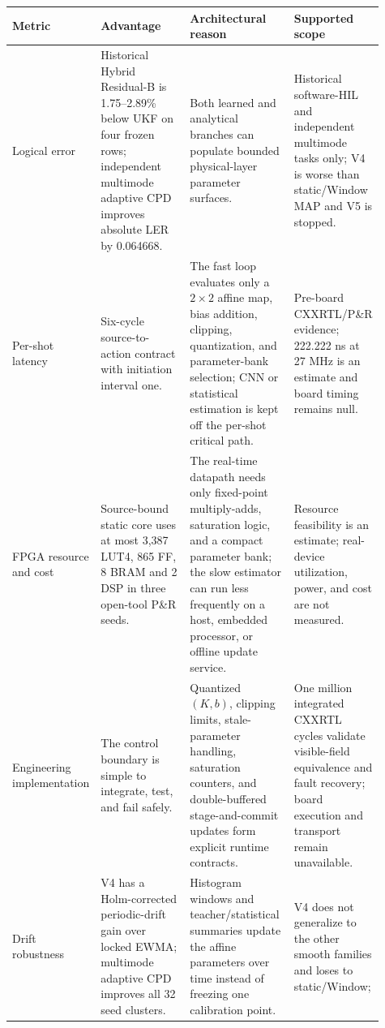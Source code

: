 \documentclass[11pt]{article}
\begin{document}
\begin{table}[ht]
\centering
\scriptsize
\renewcommand{\arraystretch}{1.06}
\begin{tabular}{@{}>{\raggedright\arraybackslash}p{0.18\linewidth}>{\raggedright\arraybackslash}p{0.24\linewidth}>{\raggedright\arraybackslash}p{0.29\linewidth}>{\raggedright\arraybackslash}p{0.20\linewidth}@{}}
\toprule
Metric & Advantage & Architectural reason & Supported scope \\
\midrule
Logical error &
Historical Hybrid Residual-B is 1.75--2.89\% below UKF on four frozen rows;
independent multimode adaptive CPD improves absolute LER by 0.064668. &
Both learned and analytical branches can populate bounded physical-layer
parameter surfaces. &
Historical software-HIL and independent multimode tasks only; V4 is worse than
static/Window MAP and V5 is stopped. \\
\addlinespace
Per-shot latency &
Six-cycle source-to-action contract with initiation interval one. &
The fast loop evaluates only a \(2\times2\) affine map, bias addition,
clipping, quantization, and parameter-bank selection; CNN or statistical
estimation is kept off the per-shot critical path. &
Pre-board CXXRTL/P\&R evidence; 222.222 ns at 27 MHz is an estimate and board
timing remains null. \\
\addlinespace
FPGA resource and cost &
Source-bound static core uses at most 3,387 LUT4, 865 FF, 8 BRAM and 2 DSP in
three open-tool P\&R seeds. &
The real-time datapath needs only fixed-point multiply-adds, saturation logic,
and a compact parameter bank; the slow estimator can run less frequently on a
host, embedded processor, or offline update service. &
Resource feasibility is an estimate; real-device utilization, power, and cost
are not measured. \\
\addlinespace
Engineering implementation &
The control boundary is simple to integrate, test, and fail safely. &
Quantized \((K,b)\), clipping limits, stale-parameter handling, saturation
counters, and double-buffered stage-and-commit updates form explicit runtime
contracts. &
One million integrated CXXRTL cycles validate visible-field equivalence and
fault recovery; board execution and transport remain unavailable. \\
\addlinespace
Drift robustness &
V4 has a Holm-corrected periodic-drift gain over locked EWMA; multimode adaptive
CPD improves all 32 seed clusters. &
Histogram windows and teacher/statistical summaries update the affine
parameters over time instead of freezing one calibration point. &
V4 does not generalize to the other smooth families and loses to static/Window;

\end{tabular}
\end{table}
\end{document}
